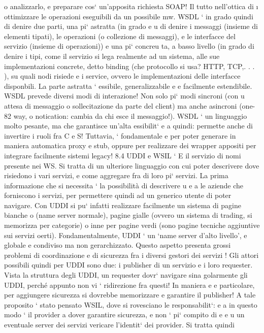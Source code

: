 \documentclass[a4paper,12pt]{article}
\begin{document}
o
analizzarlo, e preparare cos` un'apposita richiesta SOAP! Il tutto nell'ottica di
\i{}
ottimizzare le operazioni eseguibili da un possibile mw.
WSDL ` in grado quindi di denire due parti, una pi` astratta (in grado
e
u
di denire i messaggi (insieme di elementi tipati), le operazioni (o collezione di
messaggi), e le interfacce del servizio (insieme di operazioni)) e una pi` concreu
ta, a basso livello (in grado di denire i tipi, come il servizio si lega realmente
ad un sistema, alle sue implementazioni concrete, detto binding (che protocollo
si usa? HTTP, TCP,. . . ), su quali nodi risiede e i service, ovvero le implementazioni delle interfacce disponbili. La
parte astratta ` essibile, generalizzabile
e
e facilmente estendibile.
WSDL prevede diversi modi di interazione! Non solo pi` modi sincroni (con
u
attesa di messaggio o sollecitazione da parte del client) ma anche asincroni (one-
82
\newpage
way, o notication: cambia da chi esce il messaggio!).
WSDL ` un linguaggio molto pesante, ma che garantisce un'alta essibilit`
e
a
quindi: permette anche di invertire i ruoli fra C e S! Tuttavia, ` fondamentale
e
per poter generare in maniera automatica proxy e stub, oppure per realizzare
dei wrapper appositi per integrare facilmente sistemi legacy!
8.4
UDDI e WSIL
`
E il servizio di nomi presente nei WS. Si tratta di un ulteriore linguaggio con
cui poter descrivere dove risiedono i vari servizi, e come aggregare fra di loro
pi` servizi. La prima informazione che si necessita ` la possibilità di descrivere
u
e
a
le aziende che forniscono i servizi, per permettere quindi ad un generico utente
di poter navigare.
Con UDDI si pu` infatti realizzare facilmente un sistema di pagine bianche
o
(name server normale), pagine gialle (ovvero un sistema di trading, si memorizza per categorie) o inne per pagine verdi
(sono pagine tecniche aggiuntive
sui servizi oerti). Fondamentalmente, UDDI ` un {`}name server d'alto livello',
e
globale e condiviso ma non gerarchizzato. Questo aspetto presenta grossi problemi di coordinazione e di sicurezza fra i
diversi gestori dei servizi !
Gli attori possibili quindi per UDDI sono due: i publisher di un servizio e i
loro requester. Vista la struttura degli UDDI, un requester dovr` navigare sina
golarmente gli UDDI, perché appunto non vi ` ridirezione fra questi! In maniera
e
e
particolare, per aggiungere sicurezza si dovrebbe memorizzare e garantire il publisher!
A tale proposito ` stato pensato WSIL, dove si rovesciano le responsabilit`:
e
a
in questo modo ` il provider a dover garantire sicurezza, e non ` pi` compito di
e
e u
un eventuale server dei servizi vericare l'identit` dei provider. Si tratta quindi
\end{document}

